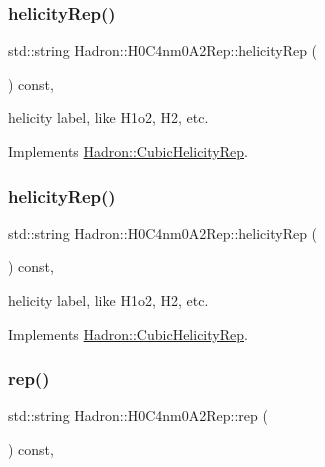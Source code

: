 \subsubsection{\texorpdfstring{helicityRep()}{helicityRep()}\hspace{0.1cm}{\footnotesize\ttfamily [2/3]}}
{\footnotesize\ttfamily std\+::string Hadron\+::\+H0\+C4nm0\+A2\+Rep\+::helicity\+Rep (\begin{DoxyParamCaption}{ }\end{DoxyParamCaption}) const\hspace{0.3cm}{\ttfamily [inline]}, {\ttfamily [virtual]}}

helicity label, like H1o2, H2, etc. 

Implements \mbox{\hyperlink{structHadron_1_1CubicHelicityRep_af1096946b7470edf0a55451cc662f231}{Hadron\+::\+Cubic\+Helicity\+Rep}}.

\mbox{\label{structHadron_1_1H0C4nm0A2Rep_a59dd3bff36461e4696319223e7f03082}} 
\subsubsection{\texorpdfstring{helicityRep()}{helicityRep()}\hspace{0.1cm}{\footnotesize\ttfamily [3/3]}}
{\footnotesize\ttfamily std\+::string Hadron\+::\+H0\+C4nm0\+A2\+Rep\+::helicity\+Rep (\begin{DoxyParamCaption}{ }\end{DoxyParamCaption}) const\hspace{0.3cm}{\ttfamily [inline]}, {\ttfamily [virtual]}}

helicity label, like H1o2, H2, etc. 

Implements \mbox{\hyperlink{structHadron_1_1CubicHelicityRep_af1096946b7470edf0a55451cc662f231}{Hadron\+::\+Cubic\+Helicity\+Rep}}.

\mbox{\label{structHadron_1_1H0C4nm0A2Rep_a82046f2360bc0682e6b0f7ce6b03286c}} 
\subsubsection{\texorpdfstring{rep()}{rep()}\hspace{0.1cm}{\footnotesize\ttfamily [1/5]}}
{\footnotesize\ttfamily std\+::string Hadron\+::\+H0\+C4nm0\+A2\+Rep\+::rep (\begin{DoxyParamCaption}{ }\end{DoxyParamCaption}) const\hspace{0.3cm}{\ttfamily [inline]}, {\ttfamily [virtual]}}



